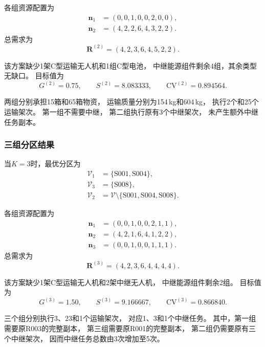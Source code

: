 \documentclass[bwprint]{gmcmthesis}
\begin{document}
各组资源配置为
\begin{align}
\boldsymbol{n}_1&=(0,0,1,0,0,2,0,0),\\
\boldsymbol{n}_2&=(4,2,2,6,4,3,2,2).
\end{align}
总需求为
\begin{equation}
\boldsymbol{R}^{(2)}=(4,2,3,6,4,5,2,2).
\end{equation}

该方案缺少1架C型运输无人机和1组C型电池，
中继能源组件剩余4组，其余类型无缺口。
目标值为
\begin{equation}
G^{(2)}=0.75,\qquad
S^{(2)}=8.083333,\qquad
\mathrm{CV}^{(2)}=0.894564.
\end{equation}

两组分别承担15箱和65箱物资，
运输质量分别为154\,kg和604\,kg，
执行2个和25个运输架次。
第一组不需要中继，
第二组执行原有3个中继架次，
未产生额外中继任务副本。

\subsubsection{三组分区结果}

当$K=3$时，最优分区为
\begin{align}
\mathcal{V}_1&=\{\mathrm{S001},\mathrm{S004}\},\\
\mathcal{V}_3&=\{\mathrm{S008}\},\\
\mathcal{V}_2&=\mathcal{V}
\setminus\{\mathrm{S001},\mathrm{S004},\mathrm{S008}\}.
\end{align}

各组资源配置为
\begin{align}
\boldsymbol{n}_1&=(0,0,1,0,0,2,1,1),\\
\boldsymbol{n}_2&=(4,2,1,6,4,1,2,2),\\
\boldsymbol{n}_3&=(0,0,1,0,0,1,1,1).
\end{align}
总需求为
\begin{equation}
\boldsymbol{R}^{(3)}=(4,2,3,6,4,4,4,4).
\end{equation}

该方案缺少1架C型运输无人机和2架中继无人机，
中继能源组件剩余2组。
目标值为
\begin{equation}
G^{(3)}=1.50,\qquad
S^{(3)}=9.166667,\qquad
\mathrm{CV}^{(3)}=0.866840.
\end{equation}

三个组分别执行3、23和1个运输架次，
对应1、3和1个中继任务。
其中，第一组需要原R003的完整副本，
第三组需要原R001的完整副本，
第二组仍需要原有三个中继架次，
因而中继任务总数由3次增加至5次。
\end{document}
